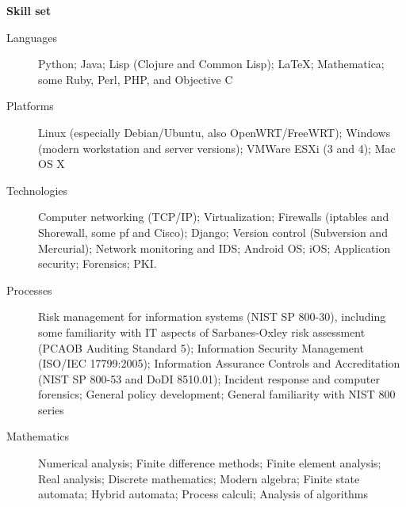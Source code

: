 \documentclass[letterpaper,11pt]{article}
\newcommand{\resheading}[1]{{\large \colorbox{mygrey}{\begin{minipage}
    {\textwidth}{\textbf{#1 \vphantom{p\^{E}}}}\end{minipage}}}}
\begin{document}
\resheading{Skill set}
\begin{description}
\item[Languages]
Python; Java; Lisp (Clojure and Common Lisp); \LaTeX; Mathematica; some Ruby, Perl, PHP, and Objective C
\item[Platforms]
Linux (especially Debian/Ubuntu, also OpenWRT/FreeWRT);
Windows (modern workstation and server versions);
VMWare ESXi (3 and 4); Mac OS X
\item[Technologies]
Computer networking (TCP/IP); Virtualization; Firewalls (iptables and Shorewall,
some pf and Cisco); Django; Version control (Subversion and Mercurial);
Network monitoring and IDS; Android OS; iOS; Application
security; Forensics; PKI.
\item[Processes]
Risk management for information systems (NIST SP 800-30),
including some familiarity with IT aspects of Sarbanes-Oxley risk assessment
(PCAOB Auditing Standard 5); Information Security Management (ISO/IEC 17799:2005);
Information Assurance Controls and Accreditation (NIST SP 800-53 and DoDI 8510.01);
Incident response and computer forensics; General policy development;
General familiarity with NIST 800 series
\item[Mathematics]
Numerical analysis; Finite difference methods; Finite element analysis;
Real analysis; Discrete mathematics; Modern algebra; Finite state automata;
Hybrid automata; Process calculi; Analysis of algorithms
\end{description}
\end{document}
